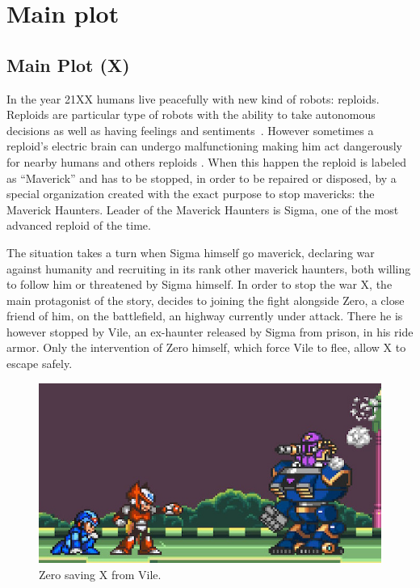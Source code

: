 \chapter[Main plot]{Main plot}
\section{Main Plot (X)}
In the year 21XX humans live peacefully with new kind of robots: reploids. Reploids are particular type of robots with the ability to take autonomous decisions as well as having feelings and sentiments~\cite{Xcoll1:Manual_X1}. However sometimes  a reploid's electric brain can undergo  malfunctioning making him act dangerously for nearby humans and others reploids . When this happen the reploid is labeled as ``Maverick'' and has to be stopped, in order to be repaired or disposed, by a special organization created with the exact purpose to stop mavericks: the Maverick Haunters. Leader of the Maverick Haunters is Sigma, one of the most advanced reploid of the time. 

The situation takes a turn when Sigma himself go maverick, declaring war against humanity and recruiting in its rank other maverick haunters, both willing to follow him or threatened by Sigma himself. In order to stop the war X, the main protagonist of the story, decides to joining the fight alongside Zero, a close friend of him, on the battlefield, an highway currently under attack. There he is however stopped by Vile, an ex-haunter released by Sigma from prison, in his ride armor. Only the intervention of Zero himself, which force Vile to flee, allow X to escape safely.
\begin{figure}[htp]
	\centering
	\includegraphics[width=0.5\linewidth]{figures/X1/Highway_end.jpg}
	\caption{Zero saving X from Vile.}
\end{figure}

